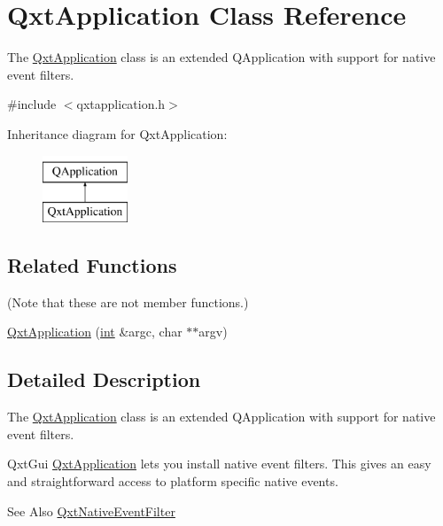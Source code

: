 \hypertarget{class_qxt_application}{\section{Qxt\-Application Class Reference}
\label{class_qxt_application}
}


The \hyperlink{class_qxt_application}{Qxt\-Application} class is an extended Q\-Application with support for native event filters.  




{\ttfamily \#include $<$qxtapplication.\-h$>$}

Inheritance diagram for Qxt\-Application\-:\begin{figure}[H]
\begin{center}
\leavevmode
\includegraphics[height=2.000000cm]{class_qxt_application}
\end{center}
\end{figure}
\subsection*{Related Functions}
(Note that these are not member functions.) \begin{DoxyCompactItemize}
\item 
\hyperlink{class_qxt_application_a0ef7f15ef27cee5fee11b7390a1b9d54}{Qxt\-Application} (\hyperlink{ioapi_8h_a787fa3cf048117ba7123753c1e74fcd6}{int} \&argc, char $\ast$$\ast$argv)
\end{DoxyCompactItemize}


\subsection{Detailed Description}
The \hyperlink{class_qxt_application}{Qxt\-Application} class is an extended Q\-Application with support for native event filters. 

Qxt\-Gui \hyperlink{class_qxt_application}{Qxt\-Application} lets you install native event filters. This gives an easy and straightforward access to platform specific native events.

\begin{DoxySeeAlso}{See Also}
\hyperlink{class_qxt_native_event_filter}{Qxt\-Native\-Event\-Filter} 
\end{DoxySeeAlso}


